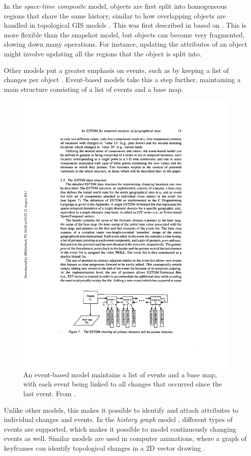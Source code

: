 In the \emph{space-time composite} model, objects are first split into homogeneous regions that share the same history, similar to how overlapping objects are handled in topological GIS models \citep{Rossignac89}.
This was first described in \citet{Chrisman83} based on \citet{Peucker75}.
This is more flexible than the snapshot model, but objects can become very fragmented, slowing down many operations.
For instance, updating the attributes of an object might involve updating all the regions that the object is split into.

Other models put a greater emphasis on events, such as by keeping a list of changes per object \citep{Worboys92,Peuquet94}.
Event-based models \citep{Peuquet95} take this a step further, maintaining a main structure consisting of a list of events and a base map.
\begin{figure}[tbp]
\centering
\includegraphics[width=0.85\linewidth]{figs/st_events}
\caption[An event-based model]{An event-based model maintains a list of events and a base map, with each event being linked to all changes that occurred since the last event. From \citet{Peuquet95}.}
\label{fig:st_events}
\end{figure}
Unlike other models, this makes it possible to identify and attach attributes to individual changes and events.
In the \emph{history graph} model \citep{Renolen96}, different types of events are supported, which makes it possible to model continuously changing events as well.
Similar models are used in computer animations, where a graph of keyframes can identify topological changes in a 2D vector drawing \citep{Dalstein15}.


